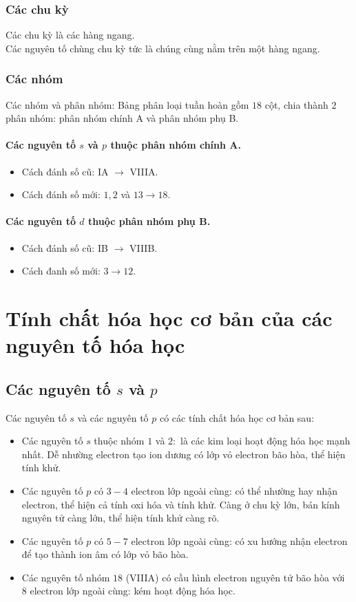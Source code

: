 \subsubsection{Các chu kỳ}
Các chu kỳ là các hàng ngang.\\
Các nguyên tố chùng chu kỳ tức là chúng cùng nằm trên một hàng ngang.
\subsubsection{Các nhóm}
Các nhóm và phân nhóm: Bảng phân loại tuần hoàn gồm $18$ cột, chia thành $2$ phân nhóm: phân nhóm chính A và phân nhóm phụ B.
\paragraph{Các nguyên tố $s$ và $p$ thuộc phân nhóm chính A.}
\begin{itemize}
\item Cách đánh số cũ: IA $\to$ VIIIA.
\item Cách đánh số mới: $1, 2$ và $13 \to 18.$
\end{itemize}
\paragraph{Các nguyên tố $d$ thuộc phân nhóm phụ B.}
\begin{itemize}
\item Cách đánh số cũ: IB $\to$ VIIIB.
\item Cách đanh số mới: $3 \to 12.$
\end{itemize}
\section{Tính chất hóa học cơ bản của các nguyên tố hóa học}
\subsection{Các nguyên tố $s$ và $p$}
Các nguyên tố $s$ và các nguyên tố $p$ có các tính chất hóa học cơ bản sau:
\begin{itemize}
\item Các nguyên tố $s$ thuộc nhóm $1$ và $2:$ là các kim loại hoạt động hóa học mạnh nhất. Dễ nhường electron tạo ion dương có lớp vỏ electron bão hòa, thể hiện tính khử.
\item Các nguyên tố $p$ có $3 - 4$ electron lớp ngoài cùng: có thể nhường hay nhận electron, thể hiện cả tính oxi hóa và tính khử. Càng ở chu kỳ lớn, bán kính nguyên tử càng lớn, thể hiện tính khử càng rõ.
\item Các nguyên tố $p$ có $5 - 7$ electron lớp ngoài cùng: có xu hướng nhận electron để tạo thành ion âm có lớp vỏ bão hòa.
\item Các nguyên tố nhóm $18$ (VIIIA) có cầu hình electron nguyên tử bão hòa với 8 electron lớp ngoài cùng: kém hoạt động hóa học.
\end{itemize}

